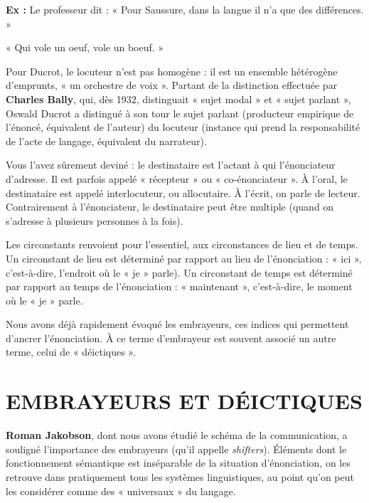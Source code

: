 \textbf{Ex :} Le professeur dit : « Pour Saussure, dans la langue il n’a que des différences. »

\hspace*{1.5em}« Qui vole un oeuf, vole un boeuf. »

Pour Ducrot, le locuteur n’est pas homogène : il est un ensemble hétérogène d’emprunts, « un orchestre de voix ». Partant de la distinction effectuée par \textbf{Charles Bally}, qui, dès 1932, distinguait « sujet modal » et « sujet parlant », Oswald Ducrot a distingué à son tour le sujet parlant (producteur empirique de l’énoncé, équivalent de l’auteur) du locuteur (instance qui prend la responsabilité de l’acte de langage, équivalent du narrateur).

Vous l’avez sûrement deviné : le destinataire est l’actant à qui l’énonciateur d’adresse. Il est parfois appelé « récepteur » ou « co-énonciateur ». À l’oral, le destinataire est appelé interlocuteur, ou allocutaire. À l’écrit, on parle de lecteur. Contrairement à l’énonciateur, le destinataire peut être multiple (quand on s’adresse à plusieurs personnes à la fois).

Les circonstants renvoient pour l’essentiel, aux circonstances de lieu et de temps. Un circonstant de lieu est déterminé par rapport au lieu de l’énonciation : « ici », c’est-à-dire, l’endroit où le « je » parle). Un circonstant de temps est déterminé par rapport au temps de l’énonciation : « maintenant », c’est-à-dire, le moment où le « je » parle.

Nous avons déjà rapidement évoqué les embrayeurs, ces indices qui permettent d’ancrer l’énonciation. À ce terme d’embrayeur est souvent associé un autre terme, celui de « déictiques ».

\section{EMBRAYEURS ET DÉICTIQUES}
\textbf{Roman Jakobson}, dont nous avons étudié le schéma de la communication, a souligné l’importance des embrayeurs (qu’il appelle \textit{shifters}). Éléments dont le fonctionnement sémantique est inséparable de la situation d’énonciation, on les retrouve dans pratiquement tous les systèmes linguistiques, au point qu’on peut les considérer comme des « universaux » du langage.

